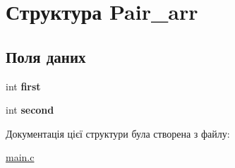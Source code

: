 \hypertarget{structPair__arr}{}\section{Структура Pair\+\_\+arr}
\label{structPair__arr}
\subsection*{Поля даних}
\begin{DoxyCompactItemize}
\item 
\mbox{\label{structPair__arr_a0f41dd8f91b3d41b4f7d57a66a1775f6}} 
int {\bfseries first}
\item 
\mbox{\label{structPair__arr_ae33c2ca5fc162c0960750bf69d61d320}} 
int {\bfseries second}
\end{DoxyCompactItemize}


Документація цієї структури була створена з файлу\+:\begin{DoxyCompactItemize}
\item 
\hyperlink{main_8c}{main.\+c}\end{DoxyCompactItemize}
